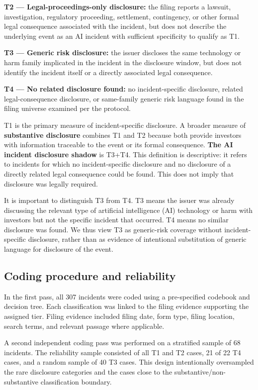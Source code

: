 \documentclass[utf8]{FrontiersinHarvard}
\begin{document}
\textbf{T2 --- Legal-proceedings-only disclosure:} the filing reports a lawsuit, investigation, regulatory proceeding, settlement, contingency, or other formal legal consequence associated with the incident, but does not describe the underlying event as an AI incident with sufficient specificity to qualify as T1.

\textbf{T3 --- Generic risk disclosure:} the issuer discloses the same technology or harm family implicated in the incident in the disclosure window, but does not identify the incident itself or a directly associated legal consequence.

\textbf{T4 --- No related disclosure found:} no incident-specific disclosure, related legal-consequence disclosure, or same-family generic risk language found in the filing universe examined per the protocol.

T1 is the primary measure of incident-specific disclosure. A broader measure of \textbf{substantive disclosure} combines T1 and T2 because both provide investors with information traceable to the event or its formal consequence. \textbf{The AI incident disclosure shadow} is T3+T4. This definition is descriptive: it refers to incidents for which no incident-specific disclosure and no disclosure of a directly related legal consequence could be found. This does not imply that disclosure was legally required.

It is important to distinguish T3 from T4. T3 means the issuer was already discussing the relevant type of artificial intelligence (AI) technology or harm with investors but not the specific incident that occurred. T4 means no similar disclosure was found. We thus view T3 as generic-risk coverage without incident-specific disclosure, rather than as evidence of intentional substitution of generic language for disclosure of the event.

\subsection{Coding procedure and reliability}
In the first pass, all 307 incidents were coded using a pre-specified codebook and decision tree. Each classification was linked to the filing evidence supporting the assigned tier. Filing evidence included filing date, form type, filing location, search terms, and relevant passage where applicable.

A second independent coding pass was performed on a stratified sample of 68 incidents. The reliability sample consisted of all T1 and T2 cases, 21 of 22 T4 cases, and a random sample of 40 T3 cases. This design intentionally oversampled the rare disclosure categories and the cases close to the substantive/non-substantive classification boundary.
\end{document}
